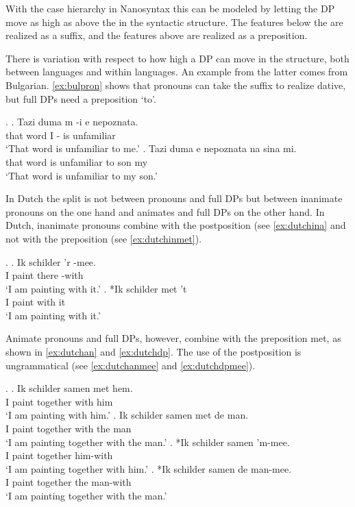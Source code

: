 \documentclass[12pt]{article}
\begin{document}
With the case hierarchy in Nanosyntax this can be modeled by letting the DP move as high as above the  in the syntactic structure. The features below the  are realized as a suffix, and the features above  are realized as a preposition.

There is variation with respect to how high a DP can move in the structure, both between languages and within languages. An example from the latter comes from Bulgarian. \ref{ex:bulpron} shows that pronouns can take the suffix  to realize dative, but full DPs need a preposition  `to'.

\ex.\label{ex:bulgarian}
\ag. Tazi duma m -i e nepoznata.\\
that word I - is unfamiliar\\
`That word is unfamiliar to me.'\label{ex:bulpron}
\bg. Tazi duma e nepoznata na sina mi.\\
that word is unfamiliar to son my\\
`That word is unfamiliar to my son.'\label{ex:buldpto} \hfill \citep[39]{caha2009}

In Dutch the split is not between pronouns and full DPs but between inanimate pronouns on the one hand and animates and full DPs on the other hand. In Dutch, inanimate pronouns combine with the postposition  (see \ref{ex:dutchina} and not with the preposition  (see \ref{ex:dutchinmet}).

\ex.
\ag. Ik schilder 'r -mee.\\
 I paint there -with\\
 `I am painting with it.'\label{ex:dutchina}
\bg. *Ik schilder met 't\\
 I paint with it\\
 `I am painting with it.'\label{ex:dutchinmet}

Animate pronouns and full DPs, however, combine with the preposition met, as shown in \ref{ex:dutchan} and \ref{ex:dutchdp}. The use of the postposition  is ungrammatical (see \ref{ex:dutchanmee} and \ref{ex:dutchdpmee}).

\ex.
\ag. Ik schilder samen met hem.\\
 I paint together with him\\
 `I am painting with him.'\label{ex:dutchan}
\bg. Ik schilder samen met de man.\\
 I paint together with the man\\
 `I am painting together with the man.'\label{ex:dutchdp}
\bg. *Ik schilder samen 'm-mee.\\
 I paint together him-with\\
 `I am painting together with him.'\label{ex:dutchanmee}
\bg. *Ik schilder samen de man-mee.\\
 I paint together the man-with\\
 `I am painting together with the man.'\label{ex:dutchdpmee}
\end{document}
